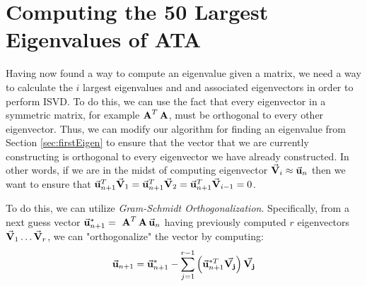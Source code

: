 \section{Computing the 50 Largest Eigenvalues of ATA} \label{sec:50eigen}
Having now found a way to compute an eigenvalue given a matrix, we need a way to calculate the $i$ largest eigenvalues and and associated eigenvectors in order to perform ISVD. To do this, we can use the fact that every eigenvector in a symmetric matrix, for example $\operatorname{\mathbf{A}}^T\operatorname{\mathbf{A}}$, must be orthogonal to every other eigenvector. Thus, we can modify our algorithm for finding an eigenvalue from Section \ref{sec:firstEigen}
to ensure that the vector that we are currently constructing is orthogonal to every eigenvector we
have already constructed. In other words, if we are in the midst of computing eigenvector $\vec{\mathbf{V}}_i \approx \vec{\mathbf{u}}_n$ then we want to ensure that $\vec{\mathbf{u}}_{n+1}^{T}\vec{\mathbf{V}}_1=\vec{\mathbf{u}}_{n+1}^{T}\vec{\mathbf{V}}_2=\vec{\mathbf{u}}_{n+1}^{T}\vec{\mathbf{V}}_{i-1}=0$.

To do this, we can utilize  \textit{Gram-Schmidt Orthogonalization}. Specifically, from
a next guess vector $\mvec{u}_{n+1}^{*} =\ \mtrA^T\mtrA\mvec{u}_{n}$ having previously computed 
$r$ eigenvectors $\vec{\mathbf{V}}_1 \dots \vec{\mathbf{V}}_r$, we can "orthogonalize" the vector by computing:
\begin{equation*}
    \vec{\mathbf{u}}_{n+1} = \vec{\mathbf{u}}_{n+1}^{*}-\sum _{j=1}^{r-1}\left(\vec{\mathbf{u}}_{n+1}^{* T\:}\vec{\mathbf{V_j}}\right)\vec{\mathbf{V_j}}
\end{equation*}

